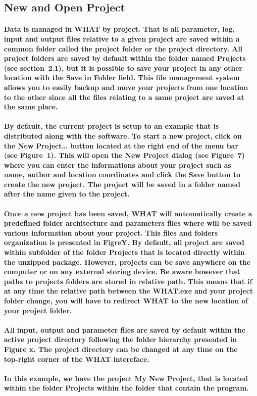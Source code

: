 \documentclass[10pt, letterpaper, fleqn]{report}
\begin{document}
\subsection{New and Open Project}

\paragraph{Data is managed in WHAT by project. That is all parameter, log, input and output files relative to a given project are saved within a common folder called the project folder or the project directory. All project folders are saved by default within the folder named Projects (see section 2.1), but it is possible to save your project in any other location with the Save in Folder field. This file management system allows you to easily backup and move your projects from one location to the other since all the files relating to a same project are saved at the same place.}
\paragraph{By default, the current project is setup to an example that is distributed along with the software. To start a new project, click on the New Project… button located at the right end of the menu bar (see Figure 1). This will open the New Project dialog (see Figure 7) where you can enter the informations about your project such as name, author and location coordinates and click the Save button to create the new project. The project will be saved in a folder named after the name given to the project.}
\paragraph{Once a new project has been saved, WHAT will automatically create a predefined folder architecture and parameters files where will be saved various information about your project. This files and folders organization is presented in FigreY. By default, all project are saved within subfolder of the folder Projects that is located directly within the unzipped package. However, projects can be save anywhere on the computer or on any external storing device. Be aware however that paths to projects folders are stored in relative path. This means that if at any time the relative path between the WHAT.exe and your project folder change, you will have to redirect WHAT to the new location of your project folder.}
\paragraph{All input, output and parameter files are saved by default within the active project directory following the folder hierarchy presented in Figure x. The project directory can be changed at any time on the top-right corner of the WHAT intereface.}
\paragraph{In this example, we have the project My New Project, that is located within the folder Projects within the folder that contain the program.}
\end{document}
